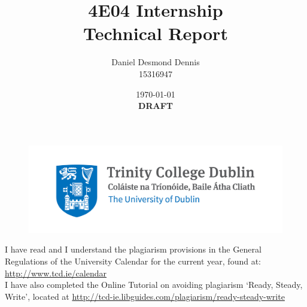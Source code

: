 \documentclass[11pt]{article}
\begin{document}
\newpage
\setcounter{section}{0}
\begin{figure}
    \includegraphics[width=\linewidth]{../img/tcd_logo.jpg}
\end{figure}
\title{4E04 Internship\\ Technical Report}
\author{Daniel Desmond Dennis\\ 15316947}
\date{\today\\ {\bfseries DRAFT}}
\maketitle



I have read and I understand the plagiarism provisions in the General Regulations of the University Calendar for the current year, found at: \url{http://www.tcd.ie/calendar}\\

I have also completed the Online Tutorial on avoiding plagiarism ‘Ready, Steady, Write’, located at \url{http://tcd-ie.libguides.com/plagiarism/ready-steady-write}\\

\newpage
\setcounter{tocdepth}{2}
\tableofcontents
\newpage


\newpage
\setcounter{section}{0}


\newpage
\setcounter{section}{0}
\end{document}
